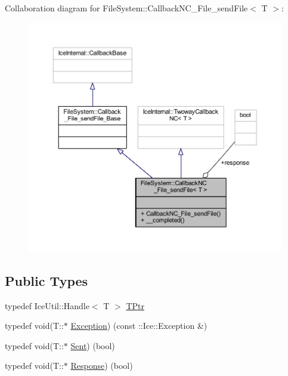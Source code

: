 Collaboration diagram for File\+System\+:\+:Callback\+N\+C\+\_\+\+File\+\_\+send\+File$<$ T $>$\+:
\nopagebreak
\begin{figure}[H]
\begin{center}
\leavevmode
\includegraphics[width=350pt]{class_file_system_1_1_callback_n_c___file__send_file__coll__graph}
\end{center}
\end{figure}
\subsection*{Public Types}
\begin{DoxyCompactItemize}
\item 
typedef Ice\+Util\+::\+Handle$<$ T $>$ \hyperlink{class_file_system_1_1_callback_n_c___file__send_file_a0b4de40be68e6670f4d7d887127adfa1}{T\+Ptr}
\item 
typedef void(T\+::$\ast$ \hyperlink{class_file_system_1_1_callback_n_c___file__send_file_a6b3e46d31e2767255629f84dbdc41de1}{Exception}) (const \+::Ice\+::\+Exception \&)
\item 
typedef void(T\+::$\ast$ \hyperlink{class_file_system_1_1_callback_n_c___file__send_file_a64d311bef39e6c24f7294a62ac449373}{Sent}) (bool)
\item 
typedef void(T\+::$\ast$ \hyperlink{class_file_system_1_1_callback_n_c___file__send_file_ac2f2e02236bc1e7302a100c796b9d881}{Response}) (bool)
\end{DoxyCompactItemize}
